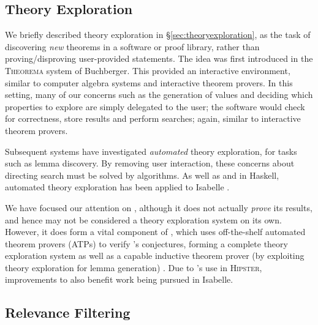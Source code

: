 \subsection{Theory Exploration}

We briefly described theory exploration in \S \ref{sec:theoryexploration}, as the task of discovering \emph{new} theorems in a software or proof library, rather than proving/disproving user-provided statements. The idea was first introduced in the \textsc{Theorema} \cite{buchberger2000theory} system of Buchberger. This provided an interactive environment, similar to computer algebra systems and interactive theorem provers. In this setting, many of our concerns such as the generation of values and deciding which properties to explore are simply delegated to the user; the software would check for correctness, store results and perform searches; again, similar to interactive theorem provers.

Subsequent systems have investigated \emph{automated} theory exploration, for tasks such as lemma discovery. By removing user interaction, these concerns about directing search must be solved by algorithms. As well as \qspec{} and \hspec{} in Haskell, automated theory exploration has been applied to Isabelle \cite{Montano-Rivas.McCasland.Dixon.ea:2012, johansson2009isacosy, Hipster}.

We have focused our attention on \qspec{}, although it does not actually \emph{prove} its results, and hence may not be considered a theory exploration system on its own. However, it does form a vital component of \hspec{}, which uses off-the-shelf automated theorem provers (ATPs) to verify \qspec{}'s conjectures, forming a complete theory exploration system as well as a capable inductive theorem prover (by exploiting theory exploration for lemma generation) \cite{claessen2013automating}. Due to \hspec{}'s use in \textsc{Hipster}, improvements to \qspec{} also benefit work being pursued in Isabelle.

\subsection{Relevance Filtering}
\label{sec:relevance}

